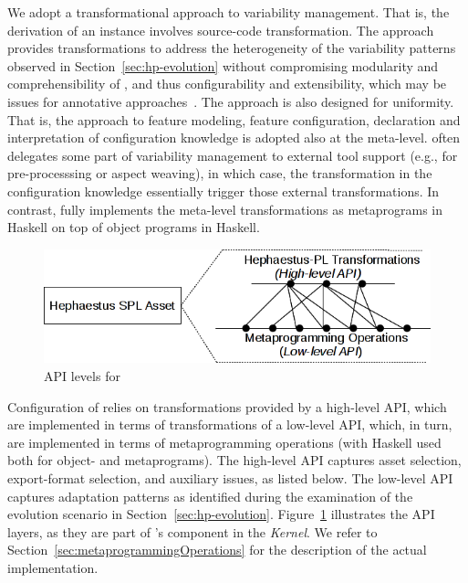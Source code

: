 We adopt a transformational approach to variability management. That is, the derivation of an \hpl{} instance involves source-code transformation. The approach provides transformations to address the heterogeneity of the variability patterns observed in Section~\ref{sec:hp-evolution} without compromising modularity and comprehensibility of \hpl, and thus configurability and extensibility, which may be issues for annotative approaches~\cite{kastner:2008}. The approach is also designed for uniformity. That is, the \hp{} approach to feature modeling, feature configuration, declaration and interpretation of configuration knowledge is adopted also at the meta-level. \hp{} often delegates some part of variability management to external tool support (e.g., for pre-processsing or aspect weaving), in which case, the transformation in the configuration knowledge essentially trigger those external transformations. In contrast, \hpl{} fully implements the meta-level transformations as metaprograms in Haskell on top of object programs in Haskell.


\begin{figure}[t!]
\includegraphics[scale=0.7]{imagens/apis-hpl-asset.png}
\caption{API levels for \hpsplasset}
\label{fig:hpl-apis}
\end{figure}


Configuration of \hpl{} relies on transformations provided by a high-level API, which are implemented in terms of 
transformations of a low-level API, which, in turn, are implemented in terms of metaprogramming operations (with Haskell used both for object- and metaprograms).  The high-level API captures asset selection, export-format selection, and auxiliary issues, as listed below. The low-level API captures adaptation patterns as identified during the examination of the evolution scenario in Section~\ref{sec:hp-evolution}. Figure~\ref{fig:hpl-apis} illustrates the API layers, as they are part of \hpl's component \hpsplasset{} in the \emph{Kernel}. We refer to  Section~\ref{sec:metaprogrammingOperations} for the description of the actual implementation.

